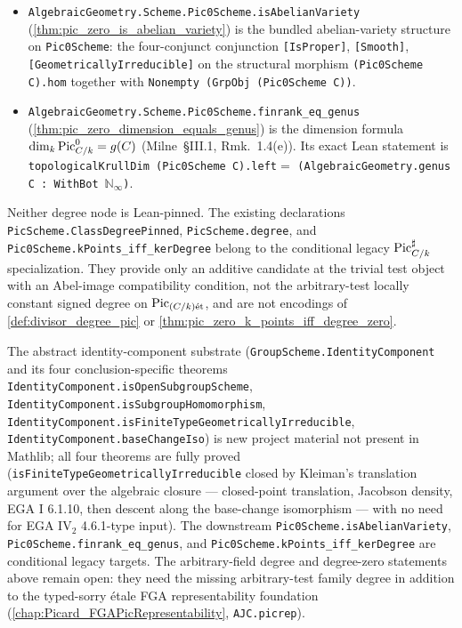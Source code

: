 \begin{itemize}
    \cref{thm:pic_is_group_scheme}.
  \item \texttt{AlgebraicGeometry.Scheme.Pic0Scheme.isAbelianVariety}
    (\cref{thm:pic_zero_is_abelian_variety}) is the bundled
    abelian-variety structure on \texttt{Pic0Scheme}: the four-conjunct
    conjunction \texttt{[IsProper]}, \texttt{[Smooth]},
    \texttt{[GeometricallyIrreducible]} on the structural morphism
    \texttt{(Pic0Scheme C).hom} together with
    \texttt{Nonempty (GrpObj (Pic0Scheme C))}.
  \item \texttt{AlgebraicGeometry.Scheme.Pic0Scheme.finrank\_eq\_genus}
    (\cref{thm:pic_zero_dimension_equals_genus}) is the dimension
    formula \(\dim_k \operatorname{Pic}^0_{C/k} = g(C)\) (Milne~\S III.1,
    Rmk.~1.4(e)). Its exact Lean statement is
    \texttt{topologicalKrullDim (Pic0Scheme C).left}\(={}\)
    \texttt{(AlgebraicGeometry.genus C : WithBot}\,
    \(\mathbb N_\infty\)\texttt{)}.
\end{itemize}

Neither degree node is Lean-pinned. The existing declarations
\texttt{PicScheme.ClassDegreePinned}, \texttt{PicScheme.degree}, and
\texttt{Pic0Scheme.kPoints\_iff\_kerDegree} belong to the conditional legacy
\(\operatorname{Pic}^\sharp_{C/k}\) specialization. They provide only an additive candidate
at the trivial test object with an Abel-image compatibility condition, not the
arbitrary-test locally constant signed degree on \(\operatorname{Pic}_{(C/k)\mathrm{\acute{e}t}}\), and are
not encodings of \cref{def:divisor_degree_pic} or
\cref{thm:pic_zero_k_points_iff_degree_zero}.

The abstract identity-component substrate
(\texttt{GroupScheme.IdentityComponent} and its four
conclusion-specific theorems
\texttt{IdentityComponent.isOpenSubgroupScheme},
\texttt{IdentityComponent.isSubgroupHomomorphism},
\texttt{IdentityComponent.isFiniteTypeGeometricallyIrreducible},
\texttt{IdentityComponent.baseChangeIso}) is new project material not
present in Mathlib; all four theorems are fully proved
(\texttt{isFiniteTypeGeometricallyIrreducible} closed by Kleiman's
translation argument over the algebraic closure --- closed-point
translation, Jacobson density, EGA I 6.1.10, then descent along the
base-change isomorphism --- with no need for EGA IV\(_2\) 4.6.1-type
input). The downstream
\texttt{Pic0Scheme.isAbelianVariety},
\texttt{Pic0Scheme.finrank\_eq\_genus}, and
\texttt{Pic0Scheme.kPoints\_iff\_kerDegree} are conditional legacy targets.
The arbitrary-field degree and degree-zero statements above remain open: they
need the missing arbitrary-test family degree in addition to the typed-sorry
\'etale FGA representability foundation
(\cref{chap:Picard_FGAPicRepresentability}, \texttt{AJC.picrep}).

